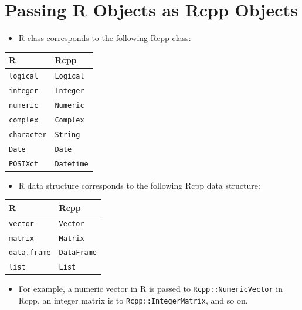 \documentclass[
]{book}
\providecommand{\tightlist}{%
  \setlength{\itemsep}{0pt}\setlength{\parskip}{0pt}}
\begin{document}
\hypertarget{passing-r-objects-as-rcpp-objects}{%
\section{Passing R Objects as Rcpp Objects}\label{passing-r-objects-as-rcpp-objects}}

\begin{itemize}
\tightlist
\item
  R class corresponds to the following Rcpp class:
\end{itemize}

\begin{longtable}[]{@{}ll@{}}
\toprule()
R & Rcpp \\
\midrule()
\endhead
\texttt{logical} & \texttt{Logical} \\
\texttt{integer} & \texttt{Integer} \\
\texttt{numeric} & \texttt{Numeric} \\
\texttt{complex} & \texttt{Complex} \\
\texttt{character} & \texttt{String} \\
\texttt{Date} & \texttt{Date} \\
\texttt{POSIXct} & \texttt{Datetime} \\
\bottomrule()
\end{longtable}

\begin{itemize}
\tightlist
\item
  R data structure corresponds to the following Rcpp data structure:
\end{itemize}

\begin{longtable}[]{@{}ll@{}}
\toprule()
R & Rcpp \\
\midrule()
\endhead
\texttt{vector} & \texttt{Vector} \\
\texttt{matrix} & \texttt{Matrix} \\
\texttt{data.frame} & \texttt{DataFrame} \\
\texttt{list} & \texttt{List} \\
\bottomrule()
\end{longtable}

\begin{itemize}
\tightlist
\item
  For example, a numeric vector in R is passed to \texttt{Rcpp::NumericVector} in Rcpp, an integer matrix is to \texttt{Rcpp::IntegerMatrix}, and so on.
\end{itemize}
\end{document}

